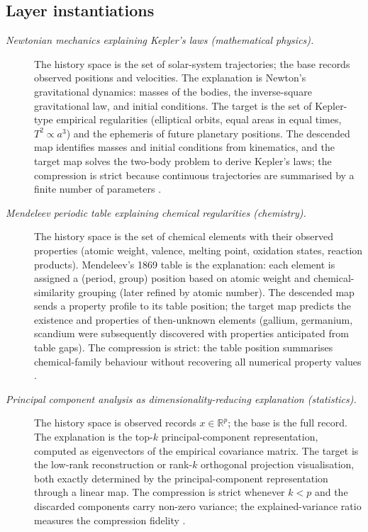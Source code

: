 \documentclass[11pt]{article}
\theoremstyle{definition}
\begin{document}
\subsection*{Layer instantiations}\label{layer-inst:F30}

\begin{description}
\item[\emph{Newtonian mechanics explaining
Kepler's laws (mathematical physics).}]
The history space is the set of solar-system
trajectories; the base records observed positions and
velocities.  The explanation is Newton's gravitational
dynamics: masses of the bodies, the inverse-square
gravitational law, and initial conditions.  The target
is the set of Kepler-type empirical regularities
(elliptical orbits, equal areas in equal times,
\(T^2\propto a^3\)) and the ephemeris of future
planetary positions.  The descended map identifies
masses and initial conditions from kinematics, and
the target map solves the two-body problem to derive
Kepler's laws; the compression is strict because
continuous trajectories are summarised by a finite
number of parameters \citep{Newton1687Principia}.

\item[\emph{Mendeleev periodic table explaining
chemical regularities (chemistry).}]
The history space is the set of chemical elements
with their observed properties (atomic weight,
valence, melting point, oxidation states, reaction
products).  Mendeleev's 1869 table is the
explanation: each element is assigned a
(period, group) position based on atomic weight and
chemical-similarity grouping (later refined by atomic
number).  The descended map sends a property profile
to its table position; the target map predicts the
existence and properties of then-unknown elements
(gallium, germanium, scandium were subsequently
discovered with properties anticipated from table
gaps).  The compression is strict: the table position
summarises chemical-family behaviour without
recovering all numerical property values
\citep{Mendeleev1869Periodic}.

\item[\emph{Principal component analysis as
dimensionality-reducing explanation (statistics).}]
The history space is observed records
\(x\in\mathbb R^p\); the base is the full record.
The explanation is the top-\(k\) principal-component
representation, computed as eigenvectors of the
empirical covariance matrix.  The target is the
low-rank reconstruction or rank-\(k\) orthogonal
projection visualisation, both exactly determined by
the principal-component representation through a
linear map.  The compression is strict whenever
\(k<p\) and the discarded components carry non-zero
variance; the explained-variance ratio measures the
compression fidelity \citep{Pearson1901PCA}.


\end{description}
\end{document}
